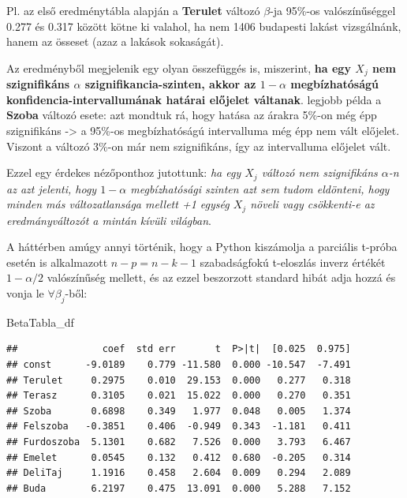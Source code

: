 \documentclass[
]{book}
\newenvironment{Shaded}{\begin{snugshade}}{\end{snugshade}}
\newcommand{\NormalTok}[1]{#1}
\begin{document}
Pl. az első eredménytábla alapján a \textbf{Terulet} változó \(\beta\)-ja 95\%-os valószínűséggel 0.277 és 0.317 között kötne ki valahol, ha nem 1406 budapesti lakást vizsgálnánk, hanem az össeset (azaz a lakások sokaságát).

Az eredményből megjelenik egy olyan összefüggés is, miszerint, \textbf{ha egy \(X_j\) nem szignifikáns \(\alpha\) szignifikancia-szinten, akkor az \(1-\alpha\) megbízhatóságú konfidencia-intervallumának határai előjelet váltanak}.
legjobb példa a \textbf{Szoba} változó esete: azt mondtuk rá, hogy hatása az árakra 5\%-on még épp szignifikáns -\textgreater{} a 95\%-os megbízhatóságú intervalluma még épp nem vált előjelet. Viszont a változó 3\%-on már nem szignifikáns, így az intervalluma előjelet vált.

Ezzel egy érdekes nézőponthoz jutottunk: \emph{ha egy \(X_j\) változó nem szignifikáns \(\alpha\)-n az azt jelenti, hogy \(1-\alpha\) megbízhatósági szinten azt sem tudom eldönteni, hogy minden más változatlansága mellett +1 egység \(X_j\) növeli vagy csökkenti-e az eredmányváltozót a mintán kívüli világban}.

A háttérben amúgy annyi történik, hogy a Python kiszámolja a parciális t-próba esetén is alkalmazott \(n-p=n-k-1\) szabadságfokú t-eloszlás inverz értékét \(1-\alpha/2\) valószínűség mellett, és az ezzel beszorzott standard hibát adja hozzá és vonja le \(\forall \beta_j\)-ből:

\begin{Shaded}
\begin{Highlighting}[]
\NormalTok{BetaTabla\_df}
\end{Highlighting}
\end{Shaded}

\begin{verbatim}
##               coef  std err       t  P>|t|  [0.025  0.975]
## const      -9.0189    0.779 -11.580  0.000 -10.547  -7.491
## Terulet     0.2975    0.010  29.153  0.000   0.277   0.318
## Terasz      0.3105    0.021  15.022  0.000   0.270   0.351
## Szoba       0.6898    0.349   1.977  0.048   0.005   1.374
## Felszoba   -0.3851    0.406  -0.949  0.343  -1.181   0.411
## Furdoszoba  5.1301    0.682   7.526  0.000   3.793   6.467
## Emelet      0.0545    0.132   0.412  0.680  -0.205   0.314
## DeliTaj     1.1916    0.458   2.604  0.009   0.294   2.089
## Buda        6.2197    0.475  13.091  0.000   5.288   7.152
\end{verbatim}
\end{document}
